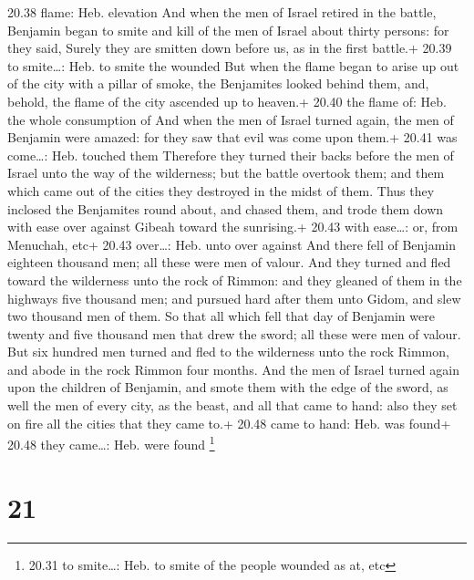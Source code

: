 20.38 flame: Heb. elevation  And when the men of Israel
retired in the battle, Benjamin began to smite and kill of the men of
Israel about thirty persons: for they said, Surely they are smitten down
before us, as in the first battle.+ 20.39 to smite\ldots: Heb. to smite
the wounded  But when the flame began to arise up out of
the city with a pillar of smoke, the Benjamites looked behind them, and,
behold, the flame of the city ascended up to heaven.+ 20.40 the flame
of: Heb. the whole consumption of  And when the men of
Israel turned again, the men of Benjamin were amazed: for they saw that
evil was come upon them.+ 20.41 was come\ldots: Heb. touched them
 Therefore they turned their backs before the men of Israel
unto the way of the wilderness; but the battle overtook them; and them
which came out of the cities they destroyed in the midst of them.
 Thus they inclosed the Benjamites round about, and chased
them, and trode them down with ease over against Gibeah toward the
sunrising.+ 20.43 with ease\ldots: or, from Menuchah, etc+ 20.43
over\ldots: Heb. unto over against  And there fell of
Benjamin eighteen thousand men; all these were men of valour.
 And they turned and fled toward the wilderness unto the
rock of Rimmon: and they gleaned of them in the highways five thousand
men; and pursued hard after them unto Gidom, and slew two thousand men
of them.  So that all which fell that day of Benjamin were
twenty and five thousand men that drew the sword; all these were men of
valour.  But six hundred men turned and fled to the
wilderness unto the rock Rimmon, and abode in the rock Rimmon four
months.  And the men of Israel turned again upon the
children of Benjamin, and smote them with the edge of the sword, as well
the men of every city, as the beast, and all that came to hand: also
they set on fire all the cities that they came to.+ 20.48 came to hand:
Heb. was found+ 20.48 they came\ldots: Heb. were found \footnote{20.31
  to smite\ldots: Heb. to smite of the people wounded as at, etc}

\hypertarget{section-20}{%
\section{21}\label{section-20}}

